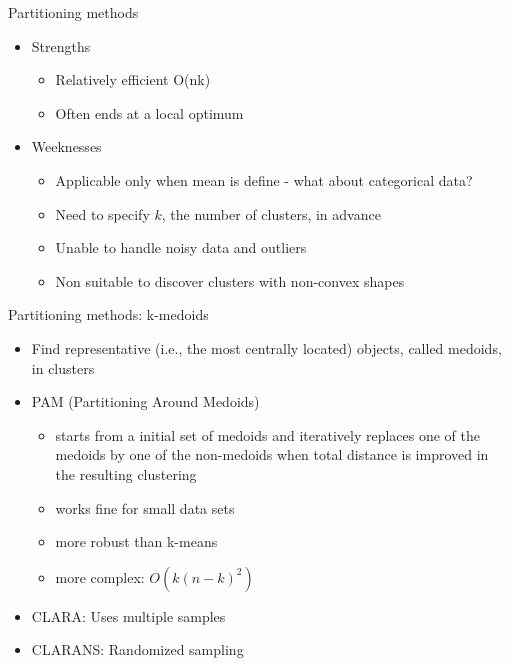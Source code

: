\documentclass[10pt,xcolor=dvipsnames]{beamer}\usepackage[]{graphicx}\usepackage[]{color}
\begin{document}
\begin{frame}{Partitioning methods}
\begin{itemize}
\item Strengths
  \begin{itemize}
   \item Relatively efficient O(nk) 
   \item Often ends at a local optimum
  \end{itemize}
\item Weeknesses
 \begin{itemize}
   \item Applicable only when mean is define - what about categorical data?
   \item Need to specify $k$, the number of clusters, in advance
   \item Unable to handle noisy data and outliers
   \item Non suitable to discover clusters with non-convex shapes
  \end{itemize}

\end{itemize}


\end{frame}



\begin{frame}{Partitioning methods: k-medoids}
\begin{itemize}
\item Find representative (i.e., the most centrally located) objects, called medoids, in clusters
\item PAM (Partitioning Around Medoids)
  \begin{itemize}
    \item starts from a initial set of medoids and iteratively replaces one of the medoids by one of the non-medoids when 
        total distance is improved in the resulting clustering
    \item works fine for small data sets
    \item more robust than k-means
    \item more complex: $O(k(n-k)^2)$
 \end{itemize}
\item CLARA: Uses multiple samples
\item CLARANS: Randomized sampling
 \end{itemize}


\end{frame}
\end{document}

